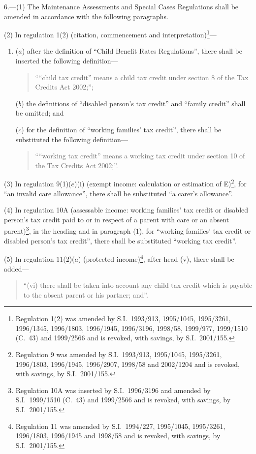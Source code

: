 \documentclass[12pt,a4paper]{article}
\begin{document}
6.---(1)  The Maintenance Assessments and Special Cases Regulations shall be amended in accordance with the following paragraphs.

(2) In regulation 1(2) (citation, commencement and interpretation)\footnote{Regulation 1(2) was amended by S.I.\ 1993/913, 1995/1045, 1995/3261, 1996/1345, 1996/1803, 1996/1945, 1996/3196, 1998/58, 1999/977, 1999/1510 (C.\ 43) and 1999/2566 and is revoked, with savings, by S.I.\ 2001/155.}—
\begin{enumerate}\item[]
($a$) after the definition of “Child Benefit Rates Regulations”, there shall be inserted the following definition—
\begin{quotation}
““child tax credit” means a child tax credit under section 8 of the Tax Credits Act 2002;”;
\end{quotation}

($b$) the definitions of “disabled person’s tax credit” and “family credit” shall be omitted; and

($c$) for the definition of “working families' tax credit”, there shall be substituted the following definition—
\begin{quotation}
““working tax credit” means a working tax credit under section 10 of the Tax Credits Act 2002;”.
\end{quotation}
\end{enumerate}

(3) In regulation 9(1)($e$)(i)  (exempt income: calculation or estimation of E)\footnote{Regulation 9 was amended by S.I.\ 1993/913, 1995/1045, 1995/3261, 1996/1803, 1996/1945, 1996/2907, 1998/58 and 2002/1204 and is revoked, with savings, by S.I.\ 2001/155.}, for “an invalid care allowance”, there shall be substituted “a carer’s allowance”.

(4) In regulation 10A (assessable income: working families' tax credit or disabled person’s tax credit paid to or in respect of a parent with care or an absent parent)\footnote{Regulation 10A was inserted by S.I.\ 1996/3196 and amended by S.I.\ 1999/1510 (C.\ 43) and 1999/2566 and is revoked, with savings, by S.I.\ 2001/155.}, in the heading and in paragraph (1), for “working families' tax credit or disabled person’s tax credit”, there shall be substituted “working tax credit”.

(5) In regulation 11(2)($a$)  (protected income)\footnote{Regulation 11 was amended by S.I.\ 1994/227, 1995/1045, 1995/3261, 1996/1803, 1996/1945 and 1998/58 and is revoked, with savings, by S.I.\ 2001/155.}, after head (v), there shall be added—
\begin{quotation}
“(vi) there shall be taken into account any child tax credit which is payable to the absent parent or his partner; and”.
\end{quotation}
\end{document}
